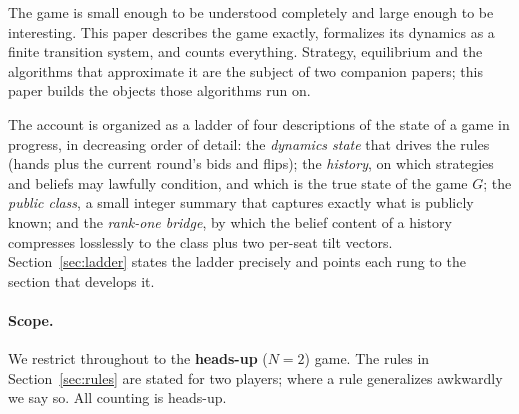 \documentclass[11pt]{article}
\theoremstyle{plain}
\theoremstyle{definition}
\theoremstyle{remark}
\begin{document}
The game is small enough to be understood completely and large enough to be
interesting. This paper describes the game exactly, formalizes its dynamics
as a finite transition system, and counts everything. Strategy, equilibrium
and the algorithms that approximate it are the subject of two companion
papers; this paper builds the objects those algorithms run on.

The account is organized as a ladder of four descriptions of the state of a
game in progress, in decreasing order of detail: the \emph{dynamics state}
that drives the rules (hands plus the current round's bids and flips); the
\emph{history}, on which strategies and beliefs may lawfully condition, and
which is the true state of the game $G$; the \emph{public class}, a small
integer summary that captures exactly what is publicly known; and the
\emph{rank-one bridge}, by which the belief content of a history compresses
losslessly to the class plus two per-seat tilt vectors.
Section~\ref{sec:ladder} states the ladder precisely and points each rung
to the section that develops it.

\paragraph{Scope.} We restrict throughout to the \textbf{heads-up} ($N=2$)
game. The rules in Section~\ref{sec:rules} are stated for two players;
where a rule generalizes awkwardly we say so. All counting is heads-up.
\end{document}
